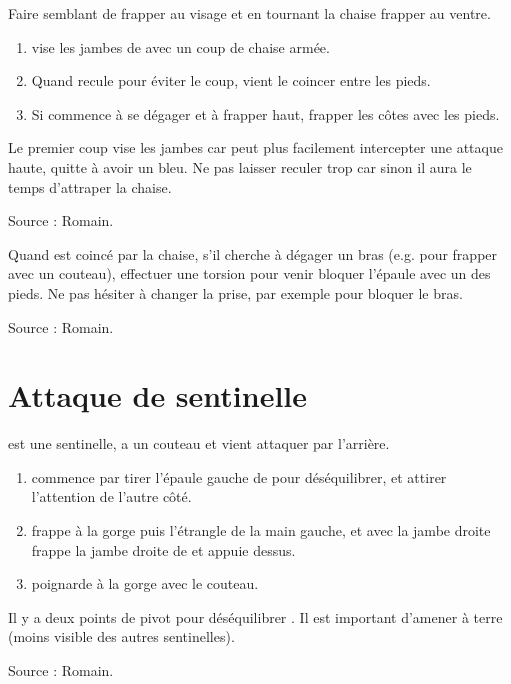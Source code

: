 \begin{coup}
\label{coup:close-combat:chaise:coup-pied}

Faire semblant de frapper au visage et en tournant la chaise frapper au ventre.
\end{coup}


\begin{technique}

\begin{enumerate}
	\item \A vise les jambes de \D avec un coup de chaise armée.
	
	\item Quand \D recule pour éviter le coup, \A vient le coincer entre les pieds.
	
	\item Si \D commence à se dégager et à frapper haut, frapper les côtes avec les pieds.
\end{enumerate}

Le premier coup vise les jambes car \D peut plus facilement intercepter une attaque haute, quitte à avoir un bleu.
Ne pas laisser \D reculer trop car sinon il aura le temps d'attraper la chaise.

Source : Romain.
\end{technique}


\begin{technique}
Quand \D est coincé par la chaise, s'il cherche à dégager un bras (e.g. pour frapper avec un couteau), effectuer une torsion pour venir bloquer l'épaule avec un des pieds.
Ne pas hésiter à changer la prise, par exemple pour bloquer le bras.

Source : Romain.
\end{technique}


\section{Attaque de sentinelle}

\D est une sentinelle, \A a un couteau et vient attaquer \D par l'arrière.


\begin{technique}

\begin{enumerate}
	\item \A commence par tirer l'épaule gauche de \D pour déséquilibrer, et attirer l'attention de l'autre côté.
	
	\item \A frappe \D à la gorge puis l'étrangle de la main gauche, et avec la jambe droite frappe la jambe droite de \D et appuie dessus.
	
	\item \A poignarde \D à la gorge avec le couteau.
\end{enumerate}

Il y a deux points de pivot pour déséquilibrer \D.
Il est important d'amener \D à terre (moins visible des autres sentinelles).

Source : Romain.
\end{technique}


